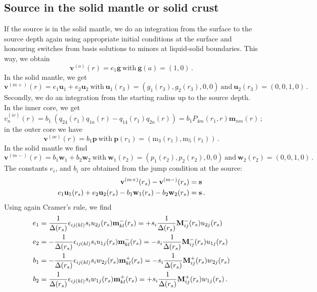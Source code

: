 \documentclass[12pt,a4paper]{article}
\begin{document}
\subsection{Source in the solid mantle or solid crust}
%
If the source is in the solid mantle, we do an integration from the surface to the source depth again using appropriate initial conditions at the surface and honouring switches from basis solutions to minors at liquid-solid boundaries. This way, we obtain
\begin{equation}
\mathbf{v}^{(o)}(r) = e_1\mathbf{g}\ \mathrm{with}\ \mathbf{g}(a) = (1,0) \,.
\end{equation}
In the solid mantle, we get
\begin{equation}
\mathbf{v}^{(m+)}(r) = e_1\mathbf{u}_1+e_2\mathbf{u}_2\ \mathrm{with}\ \mathbf{u}_1(r_3) = (g_1(r_3),g_2(r_3),0,0)\ \mathrm{and}\ \mathbf{u}_2(r_3) = (0,0,1,0) \,.
\end{equation}
Secondly, we do an integration from the starting radius up to the source depth. In the inner core, we get
\begin{equation}
v_n^{(ic)}(r) = b_1\ (q_{24}(r_1)q_{1n}(r) - q_{14}(r_1) q_{2n}(r)) = b_1 P_{4m}(r_1,r)\mathbf{m}_{nm}(r)\,;
\end{equation}
in the outer core we have
\begin{equation}
\mathbf{v}^{(oc)}(r) = b_1 \mathbf{p}\ \mathrm{with}\ \mathbf{p}(r_1) = (\mathrm{m}_3(r_1),\mathrm{m}_5(r_1)) \,.
\end{equation}
In the solid mantle we find
\begin{equation}
\mathbf{v}^{(m-)}(r) = b_1\mathbf{w}_1+b_2\mathbf{w}_2\ \mathrm{with}\ \mathbf{w}_1(r_2) = (p_1(r_2),p_2(r_2),0,0)\ \mathrm{and}\ \mathbf{w}_2(r_2) = (0,0,1,0) \,.
\end{equation}
The constants $e_i$, and $b_i$ are obtained from the jump condition at the source:
\begin{align}
\mathbf{v}^{(m+)}(r_s) - \mathbf{v}^{(m-)}(r_s) &= \mathbf{s} \notag\\
e_1\mathbf{u}_1(r_s)+e_2\mathbf{u}_2(r_s)- b_1\mathbf{w}_1(r_s)-b_2\mathbf{w}_2(r_s) &= \mathbf{s} \,.
\end{align}
Using again Cramer's rule, we find
\begin{align}
e_1 &= \frac{1}{\Delta(r_s)}\epsilon_{ij(kl)}s_i u_{2j}(r_s)\mathbf{m}^{-}_{kl}(r_s) = +s_i\frac{1}{\Delta(r_s)}\mathbf{M}^-_{ij}(r_s)u_{2j}(r_s) \notag \\ 
e_2 &= -\frac{1}{\Delta(r_s)}\epsilon_{ij(kl)}s_i u_{1j}(r_s)\mathbf{m}^{-}_{kl}(r_s) = -s_i\frac{1}{\Delta(r_s)}\mathbf{M}^-_{ij}(r_s)u_{1j}(r_s)\notag \\
b_1 &= -\frac{1}{\Delta(r_s)}\epsilon_{ij(kl)}s_i w_{2j}(r_s)\mathbf{m}^{+}_{kl}(r_s) = -s_i\frac{1}{\Delta(r_s)}\mathbf{M}^+_{ij}(r_s)w_{2j}(r_s)\notag \\ 
b_2 &= \frac{1}{\Delta(r_s)}\epsilon_{ij(kl)}s_i w_{1j}(r_s)\mathbf{m}^{+}_{kl}(r_s) = +s_i\frac{1}{\Delta(r_s)}\mathbf{M}^+_{ij}(r_s)w_{1j}(r_s)\,.
\end{align}
\end{document}
